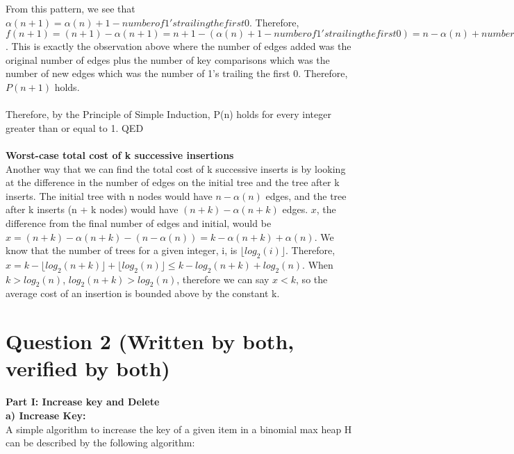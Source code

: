 \documentclass[11pt, a4paper]{article}
\begin{document}
From this pattern, we see that $\alpha(n + 1) = \alpha(n) + 1 - number of 1's trailing the first 0$. Therefore, $f(n + 1) = (n + 1) - \alpha(n + 1) = n + 1 - (\alpha(n) + 1 - number of 1's trailing the first 0) = n - \alpha(n) + number of 1's trailing the first 0 = f(n) + number of 1's trailing the first 0$. This is exactly the observation above where the number of edges added was the original number of edges plus the number of key comparisons which was the number of new edges which was the number of 1's trailing the first 0. Therefore, $P(n+1)$ holds. \\\\
Therefore, by the Principle of Simple Induction, P(n) holds for every integer greater than or equal to 1. QED
\\\\
\textbf{Worst-case total cost of k successive insertions}\\
Another way that we can find the total cost of k successive inserts is by looking at the difference in the number of edges on the initial tree and the tree after k inserts. The initial tree with n nodes would have $n - \alpha(n)$ edges, and the tree after k inserts (n + k nodes) would have $(n + k) - \alpha(n + k)$ edges. $x$, the difference from the final number of edges and initial, would be $x = (n + k) - \alpha(n + k) - (n - \alpha(n)) = k - \alpha(n + k) + \alpha(n)$. We know that the number of trees for a given integer, i, is $\lfloor log_2(i) \rfloor$. Therefore, $x = k - \lfloor log_2(n + k) \rfloor + \lfloor log_2(n) \rfloor \leq k - log_2(n + k) + log_2(n)$. When $k > log_2(n)$, $log_2(n + k)  > log_2(n)$, therefore we can say $x < k$, so the average cost of an insertion is bounded above by the constant k. 

\section*{Question 2 (Written by both, verified by both)}
\textbf{Part I: Increase key and Delete} \\
 \textbf{a) Increase Key:} \\
 A simple algorithm to increase the key of a given item in a binomial max heap H can be described by the following algorithm: \\
\end{document}
